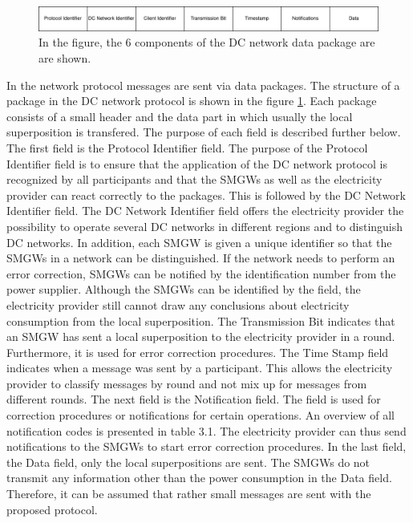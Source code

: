 \\
\\\begin{figure}[tbp]
  \centering
  \includegraphics[width=1\textwidth]{images/Header2.png}
  \caption[DC Network Frame]{
In the figure, the 6 components of the DC network data package are
are shown.}
  \label{fig:frame}
\end{figure}In the network protocol messages are sent via data packages. The structure of a package in the DC network protocol is shown in the figure \ref{fig:frame}. Each package consists of a small header and the data part in which usually the local superposition is transfered. The purpose of each field is described further below.\\
The first field is the Protocol Identifier field. The purpose of the Protocol Identifier field is to ensure that the application of the DC network protocol is recognized by all participants and that the \gls{SMGW}s as well as the electricity provider can react correctly to the packages. This is followed by the DC Network Identifier field.%
The DC Network Identifier field offers the electricity provider the possibility to operate several DC networks in different regions and to distinguish DC networks. In addition, each \gls{SMGW} is given a unique identifier so that the \gls{SMGW}s in a network can be distinguished. If the network needs to perform an error correction, \gls{SMGW}s can be notified by the identification number from the power supplier. Although the \gls{SMGW}s can be identified by the field, the electricity provider still cannot draw any conclusions about electricity consumption from the local superposition. The Transmission Bit indicates that an \gls{SMGW} has sent a local superposition to the electricity provider in a round. Furthermore, it is used for error correction procedures. The Time Stamp field indicates when a message was sent by a participant. This allows the electricity provider to classify messages by round and not mix up for messages from different rounds. The next field is the Notification field. The field is used for correction procedures or notifications for certain operations. An overview of all notification codes is presented in table 3.1. The electricity provider can thus send notifications to the \gls{SMGW}s to start error correction procedures. In the last field, the Data field, only the local superpositions are sent. The \gls{SMGW}s do not transmit any information other than the power consumption in the Data field. Therefore, it can be assumed that rather small messages are sent with the proposed protocol.\\
